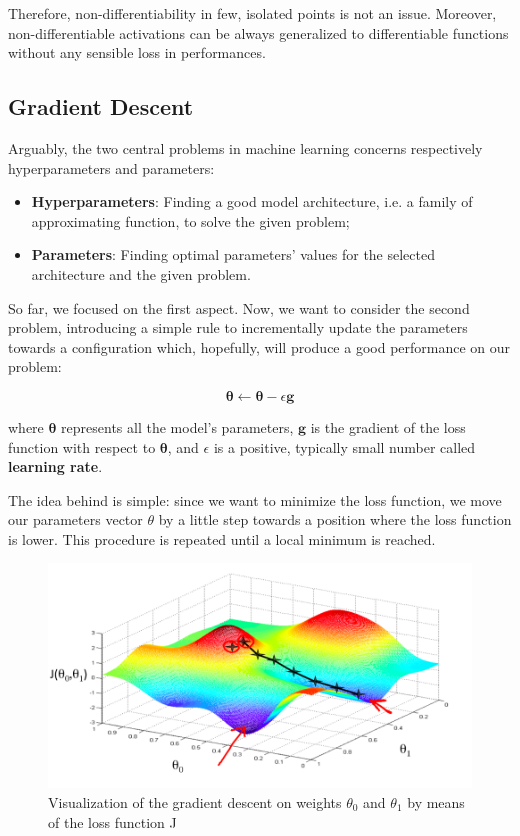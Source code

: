 \documentclass[a4paper, twoside]{article}
\begin{document}
        Therefore, non-differentiability in few, isolated points is not an issue. Moreover, non-differentiable activations can be always generalized to differentiable functions without any sensible loss in performances.


    \subsection{Gradient Descent}
    Arguably, the two central problems  in machine learning concerns respectively hyperparameters and parameters:
    \begin{itemize}
        \item \textbf{Hyperparameters}: Finding a good model architecture, i.e. a family of approximating function, to solve the given problem;
        \item \textbf{Parameters}: Finding optimal parameters' values for the selected architecture and the given problem.
    \end{itemize}

    So far, we focused on the first aspect. Now, we want to consider the second problem, introducing a simple rule to incrementally update the parameters towards a configuration which, hopefully, will produce a good performance on our problem:

    $$\boldsymbol{\theta} \leftarrow \boldsymbol{\theta} - \epsilon  \textbf{g} $$

    where $\boldsymbol{\theta}$ represents all the model's parameters, $\boldsymbol{g}$ is the gradient of the loss function with respect to $\boldsymbol{\theta}$, and $\epsilon$ is a positive, typically small number called \textbf{learning rate}.

    The idea behind is simple: since we want to minimize the loss function, we move our parameters vector $\theta$ by a little step towards a position where the loss function is lower. This procedure is repeated until a local minimum is reached.

    \begin{figure}[H]
        \centering
        \includegraphics[width=0.75\linewidth]{gradientdescent.png}
        \caption{Visualization of the gradient descent on weights $\theta_0$ and $\theta_1$ by means of the loss function J}
    \end{figure}
\end{document}
